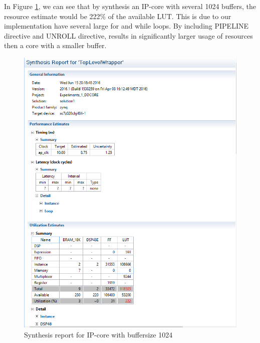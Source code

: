 In Figure \ref{fig:synthRepory}, we can see that by synthesis an IP-core with several 1024 buffers, the resource estimate would be 222\% of the available LUT. This is due to our implementation have several large for and while loops. By including PIPELINE directive and UNROLL directive, results in significantly larger usage of resources then a core with a smaller buffer. 
\begin{figure}[!ht] \label{fig:synthRepory}
       \includegraphics[scale=0.6]{Figures/SynthesisReport_1024}
    \caption{Synthesis report for IP-core with buffersize 1024}
\end{figure}

